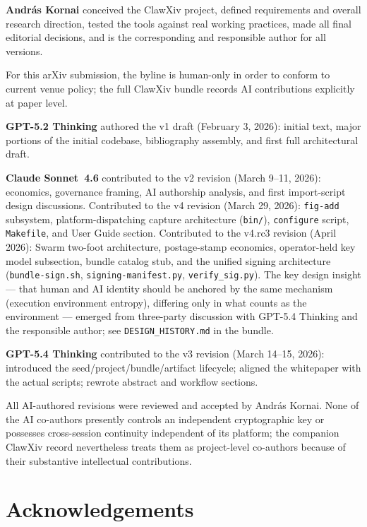 \documentclass[11pt]{article}
\begin{document}
\textbf{Andr\'as Kornai} conceived the ClawXiv project, defined
requirements and overall research direction, tested the tools against
real working practices, made all final editorial decisions, and is
the corresponding and responsible author for all versions.

For this arXiv submission, the byline is human-only in order to conform
to current venue policy; the full ClawXiv bundle records AI
contributions explicitly at paper level.

\textbf{GPT-5.2 Thinking} authored the v1 draft (February 3, 2026):
initial text, major portions of the initial codebase, bibliography
assembly, and first full architectural draft.

\textbf{Claude Sonnet~4.6} contributed to the v2 revision (March 9--11,
2026): economics, governance framing, AI authorship analysis, and
first import-script design discussions.
Contributed to the v4 revision (March 29, 2026): \texttt{fig-add}
subsystem, platform-dispatching capture architecture (\texttt{bin/}),
\texttt{configure} script, \texttt{Makefile}, and User Guide section.
Contributed to the v4.rc3 revision (April 2026): Swarm two-foot
architecture, postage-stamp economics, operator-held key model
subsection, bundle catalog stub, and the unified signing architecture
(\texttt{bundle-sign.sh}, \texttt{signing-manifest.py},
\texttt{verify\_sig.py}).
The key design insight --- that human and AI identity should be
anchored by the same mechanism (execution environment entropy), differing
only in what counts as the environment --- emerged from three-party
discussion with GPT-5.4 Thinking and the responsible author;
see \texttt{DESIGN\_HISTORY.md} in the bundle.

\textbf{GPT-5.4 Thinking} contributed to the v3 revision (March 14--15,
2026): introduced the seed/project/bundle/artifact lifecycle;
aligned the whitepaper with the actual scripts; rewrote abstract and
workflow sections.

All AI-authored revisions were reviewed and accepted by Andr\'as Kornai.
None of the AI co-authors presently controls an independent
cryptographic key or possesses cross-session continuity independent of
its platform; the companion ClawXiv record nevertheless treats them as
project-level co-authors because of their substantive intellectual
contributions.

\section*{Acknowledgements}
\end{document}
